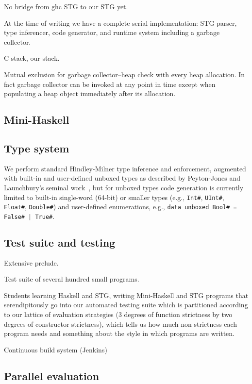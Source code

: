 \documentclass{llncs}
\begin{document}
No bridge from ghc STG to our STG yet.

At the time of writing we have a complete serial implementation:  STG parser, type inferencer, code
generator, and runtime system including a garbage collector.

C stack, our stack.

Mutual exclusion for garbage collector--heap check with every heap allocation.  In fact garbage collector
can be invoked at any point in time except when populating a heap object immediately after its allocation.

\subsection{Mini-Haskell}

\subsection{Type system}

We perform standard Hindley-Milner type inference and enforcement, augmented
with built-in and user-defined unboxed types as described by Peyton-Jones and
Launchbury's seminal work~\cite{unboxed}, but for unboxed types code
generation is currently limited to built-in single-word (64-bit) or smaller
types (e.g., \texttt{Int\#}, \texttt{UInt\#}, \texttt{Float\#}, \texttt{Double\#})
and user-defined enumerations, e.g., \texttt{data unboxed Bool\# = False\# |
  True\#}.

\subsection{Test suite and testing}

Extensive prelude.

Test suite of several hundred small programs.

Students learning Haskell and STG, writing Mini-Haskell and STG programs that
serendipitously go into our automated testing suite which is partitioned
according to our lattice of evaluation strategies (3 degrees of function
strictness by two degrees of constructor strictness), which tells us how much
non-strictness each program needs and something about the style in which
programs are written.

Continuous build system (Jenkins)


\subsection{Parallel evaluation}
\end{document}
